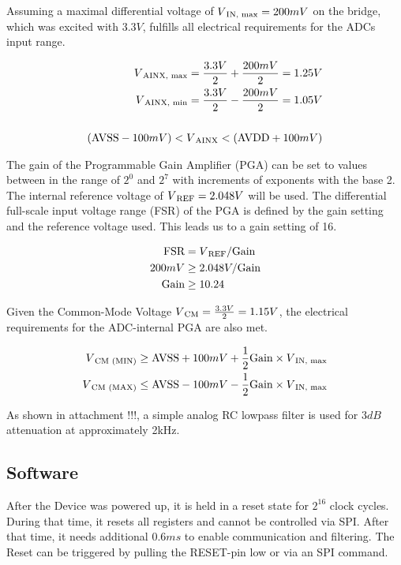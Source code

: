Assuming a maximal differential voltage of $V\textsubscript{IN, max} = 200mV$ on the bridge, which was excited with $3.3V$, fulfills all electrical requirements for the ADCs input range.

\begin{equation}
\begin{split}
V\textsubscript{AINX, max} = \frac{3.3V}{2} + \frac{200mV}{2} = 1.25V\\
V\textsubscript{AINX, min} = \frac{3.3V}{2} - \frac{200mV}{2} = 1.05V\\\\
(\mbox{AVSS} - 100mV) < V\textsubscript{AINX} < (\mbox{AVDD} + 100mV)
\end{split}
\end{equation}

The gain of the Programmable Gain Amplifier (PGA) can be set to values between in the range of $2^0$ and $2^7$ with increments of exponents with the base 2. The internal reference voltage of $V\textsubscript{REF} = 2.048V$ will be used. The differential full-scale input voltage range (FSR) of the PGA is defined by the gain setting and the reference voltage used. This leads us to a gain setting of 16.

\begin{equation}
\begin{split}
\mbox{FSR} &= V\textsubscript{REF} / \mbox{Gain}\\
200mV &\geq 2.048V / \mbox{Gain} \\
\mbox{Gain} &\geq 10.24
\end{split}
\end{equation}

Given the Common-Mode Voltage $V\textsubscript{CM} = \frac{3.3V}{2} = 1.15V$, the electrical requirements for the ADC-internal PGA are also met.

\begin{equation}
\begin{split}
V\textsubscript{CM (MIN)} &\geq \mbox{AVSS} + 100mV + \frac{1}{2} \mbox{Gain} \times V\textsubscript{IN, max} \\
V\textsubscript{CM (MAX)} &\leq \mbox{AVSS} - 100mV - \frac{1}{2} \mbox{Gain} \times V\textsubscript{IN, max}
\end{split}
\end{equation}

As shown in attachment !!!, a simple analog RC lowpass filter is used for $3dB$ attenuation at approximately 2kHz.


\subsection{Software}
After the Device was powered up, it is held in a reset state for $2^16$ clock cycles. During that time, it resets all registers and cannot be controlled via SPI. After that time, it needs additional $0.6ms$ to enable communication and filtering. The Reset can be triggered by pulling the RESET-pin low or via an SPI command.

